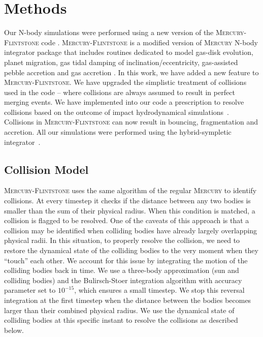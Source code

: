 \documentclass[fleqn,usenatbib]{mnras}
\begin{document}
\section{Methods}\label{sec:methods}

Our N-body simulations were performed using a new version of the \textsc{Mercury-Flintstone} code \citep{izidoro2019formation,bitschetal19}. \textsc{Mercury-Flintstone} is a modified version of \textsc{Mercury} N-body integrator package \citep{chambers1999hybrid} that includes routines dedicated to model gas-disk evolution, planet migration, gas tidal damping of inclination/eccentricity, gas-assisted pebble accretion and gas accretion \citep[for a detailed description of these routines see][]{bitschetal19,izidoro2019formation}. In this work, we have added a new feature to \textsc{Mercury-Flintstone}. We have upgraded the simplistic treatment of collisions used in the code -- where collisions are always assumed to result in perfect merging events. We have implemented into our code a prescription to resolve collisions based on the outcome of impact hydrodynamical simulations~\citep{leinhardt2012}. Collisions in \textsc{Mercury-Flintstone} can now result in bouncing, fragmentation and accretion. All our simulations were performed using the hybrid-sympletic integrator~\citep{chambers1999hybrid}.

\subsection{Collision Model}\label{collision}


\textsc{Mercury-Flintstone} uses the same algorithm of the regular \textsc{Mercury} to identify collisions. At every timestep it checks if the distance between any two bodies is smaller than the sum of their physical radius. When this condition is matched, a collision is flagged to be resolved.  One of the caveats of this approach is that a collision may be identified  when colliding bodies have already largely overlapping physical radii. In this situation, to properly resolve the collision, we need to restore the dynamical state of the colliding bodies to the very moment  when they ``touch'' each other.  We account for this issue by integrating the motion of the colliding bodies back in time. We use a three-body approximation (sun and colliding bodies) and the Bulirsch-Stoer integration algorithm with accuracy parameter set to $10^{-15}$, which ensures a small timestep.  We stop this reversal integration at the first timestep when the distance between the bodies becomes larger than their combined physical radius.  We use the dynamical state of colliding bodies at this specific instant to resolve the collisions as described below.
\end{document}
